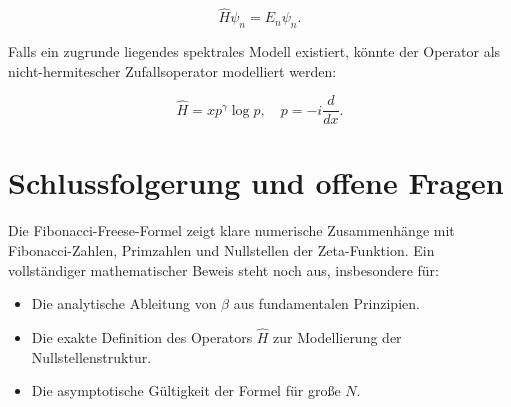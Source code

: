 \documentclass[a4paper,12pt]{article}
\begin{document}
\begin{equation}
\hat{H} \psi_n = E_n \psi_n.
\end{equation}

Falls ein zugrunde liegendes spektrales Modell existiert, könnte der Operator als nicht-hermitescher Zufallsoperator modelliert werden:

\begin{equation}
\hat{H} = x p^\gamma \log p, \quad p = -i \frac{d}{dx}.
\end{equation}

\section{Schlussfolgerung und offene Fragen}
Die Fibonacci-Freese-Formel zeigt klare numerische Zusammenhänge mit Fibonacci-Zahlen, Primzahlen und Nullstellen der Zeta-Funktion.
Ein vollständiger mathematischer Beweis steht noch aus, insbesondere für:

\begin{itemize}
    \item Die analytische Ableitung von $\beta$ aus fundamentalen Prinzipien.
    \item Die exakte Definition des Operators $\hat{H}$ zur Modellierung der Nullstellenstruktur.
    \item Die asymptotische Gültigkeit der Formel für große $N$.
\end{itemize}
\end{document}
